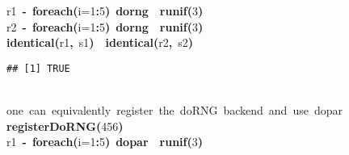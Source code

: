 \documentclass[a4paper,12pt]{article}\usepackage{graphicx, color}
\makeatletter
\newcommand{\hlnumber}[1]{\textcolor[rgb]{0,0,0}{#1}}%
\newcommand{\hlfunctioncall}[1]{\textcolor[rgb]{0.501960784313725,0,0.329411764705882}{\textbf{#1}}}%
\newcommand{\hlkeyword}[1]{\textcolor[rgb]{0,0,0}{\textbf{#1}}}%
\newcommand{\hlargument}[1]{\textcolor[rgb]{0.690196078431373,0.250980392156863,0.0196078431372549}{#1}}%
\newcommand{\hlcomment}[1]{\textcolor[rgb]{0.180392156862745,0.6,0.341176470588235}{#1}}%
\newcommand{\hlassignement}[1]{\textcolor[rgb]{0,0,0}{\textbf{#1}}}%
\newcommand{\hlsymbol}[1]{\textcolor[rgb]{0,0,0}{#1}}%
\newcommand{\hlstd}[1]{\textcolor[rgb]{0,0,0}{#1}}%
\newenvironment{kframe}{%
 \def\FrameCommand##1{\hskip\@totalleftmargin \hskip-\fboxsep
 \colorbox{shadecolor}{##1}\hskip-\fboxsep
     \hskip-\linewidth \hskip-\@totalleftmargin \hskip\columnwidth}%
 \MakeFramed {\advance\hsize-\width
   \@totalleftmargin\z@ \linewidth\hsize
   \@setminipage}}%
 {\par\unskip\endMakeFramed}
\newenvironment{knitrout}{}{} %
\renewenvironment{knitrout}{\begin{footnotesize}}{\end{footnotesize}}
\makeatother
\begin{document}
\begin{knitrout}
\begin{kframe}
\begin{flushleft}
\hlstd{}\hlsymbol{r1}{\ }\hlassignement{\usebox{\hlnormalsizeboxlessthan}-}{\ }\hlfunctioncall{foreach}\hlkeyword{(}\hlargument{i}\hlargument{=}\hlnumber{1}\hlkeyword{:}\hlnumber{5}\hlkeyword{)}{\ }\hlkeyword{\usebox{\hlnormalsizeboxpercent}dorng\usebox{\hlnormalsizeboxpercent}}{\ }\hlkeyword{\usebox{\hlnormalsizeboxopenbrace}}{\ }\hlfunctioncall{runif}\hlkeyword{(}\hlnumber{3}\hlkeyword{)}{\ }\hlkeyword{\usebox{\hlnormalsizeboxclosebrace}}\hspace*{\fill}\\
\hlstd{}\hlsymbol{r2}{\ }\hlassignement{\usebox{\hlnormalsizeboxlessthan}-}{\ }\hlfunctioncall{foreach}\hlkeyword{(}\hlargument{i}\hlargument{=}\hlnumber{1}\hlkeyword{:}\hlnumber{5}\hlkeyword{)}{\ }\hlkeyword{\usebox{\hlnormalsizeboxpercent}dorng\usebox{\hlnormalsizeboxpercent}}{\ }\hlkeyword{\usebox{\hlnormalsizeboxopenbrace}}{\ }\hlfunctioncall{runif}\hlkeyword{(}\hlnumber{3}\hlkeyword{)}{\ }\hlkeyword{\usebox{\hlnormalsizeboxclosebrace}}\hspace*{\fill}\\
\hlstd{}\hlfunctioncall{identical}\hlkeyword{(}\hlsymbol{r1}\hlkeyword{,}{\ }\hlsymbol{s1}\hlkeyword{)}{\ }\hlkeyword{\usebox{\hlnormalsizeboxand}\usebox{\hlnormalsizeboxand}}{\ }\hlfunctioncall{identical}\hlkeyword{(}\hlsymbol{r2}\hlkeyword{,}{\ }\hlsymbol{s2}\hlkeyword{)}\mbox{}
\normalfont
\end{flushleft}
\begin{verbatim}
## [1] TRUE
\end{verbatim}
\begin{flushleft}
\ttfamily\noindent
\hspace*{\fill}\\
\hlstd{}\hlcomment{\usebox{\hlnormalsizeboxhash}{\ }one{\ }can{\ }equivalently{\ }register{\ }the{\ }doRNG{\ }backend{\ }and{\ }use{\ }\usebox{\hlnormalsizeboxpercent}dopar\usebox{\hlnormalsizeboxpercent}}\hspace*{\fill}\\
\hlstd{}\hlfunctioncall{registerDoRNG}\hlkeyword{(}\hlnumber{456}\hlkeyword{)}\hspace*{\fill}\\
\hlstd{}\hlsymbol{r1}{\ }\hlassignement{\usebox{\hlnormalsizeboxlessthan}-}{\ }\hlfunctioncall{foreach}\hlkeyword{(}\hlargument{i}\hlargument{=}\hlnumber{1}\hlkeyword{:}\hlnumber{5}\hlkeyword{)}{\ }\hlkeyword{\usebox{\hlnormalsizeboxpercent}dopar\usebox{\hlnormalsizeboxpercent}}{\ }\hlkeyword{\usebox{\hlnormalsizeboxopenbrace}}{\ }\hlfunctioncall{runif}\hlkeyword{(}\hlnumber{3}\hlkeyword{)}{\ }\hlkeyword{\usebox{\hlnormalsizeboxclosebrace}}\hspace*{\fill}\\

\end{flushleft}
\end{kframe}
\end{knitrout}
\end{document}
